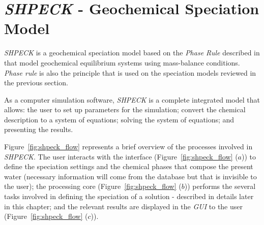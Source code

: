 
\chapter{\emph{SHPECK} - Geochemical Speciation Model}
\label{chapter:SHPECK}

\emph{SHPECK} is a geochemical speciation model based on the \emph{Phase Rule} described in \cite{Garrels:65} that model geochemical equilibrium systems using mass-balance conditions. \emph{Phase rule} is also the principle that is used on the speciation models reviewed in the previous section. 

As a computer simulation software, \emph{SHPECK} is a complete integrated model that allows: the user to set up parameters for the simulation; convert the chemical description to a system of equations; solving the system of equations; and presenting the results.

Figure~\ref{fig:shpeck_flow} represents a brief overview of the processes involved in \emph{SHPECK}. The user interacts with the interface (Figure~\ref{fig:shpeck_flow} ($a$)) to define the speciation settings and the chemical phases that compose the present water (necessary information will come from the database but that is invisible to the user); the processing core (Figure~\ref{fig:shpeck_flow} ($b$)) performs the several tasks involved in defining the speciation of a solution - described in details later in this chapter; and the relevant results are displayed in the \emph{GUI} to the user (Figure~\ref{fig:shpeck_flow} ($c$)).

